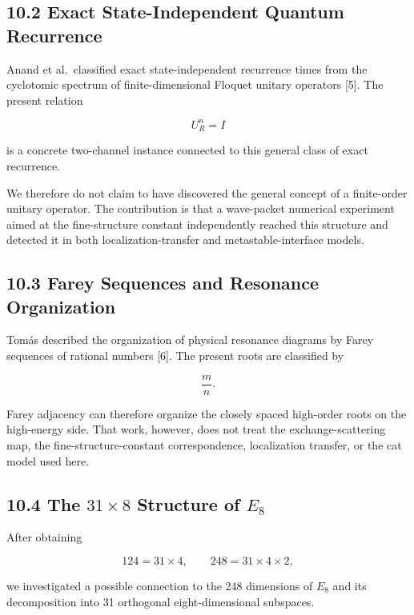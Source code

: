 \documentclass[
  10pt,
  a4paper,
]{article}
\begin{document}
\subsection{10.2 Exact State-Independent Quantum
Recurrence}\label{exact-state-independent-quantum-recurrence}

Anand et al.~classified exact state-independent recurrence times from
the cyclotomic spectrum of finite-dimensional Floquet unitary operators
{[}5{]}. The present relation

\[
U_R^n=I
\]

is a concrete two-channel instance connected to this general class of
exact recurrence.

We therefore do not claim to have discovered the general concept of a
finite-order unitary operator. The contribution is that a wave-packet
numerical experiment aimed at the fine-structure constant independently
reached this structure and detected it in both localization-transfer and
metastable-interface models.

\subsection{10.3 Farey Sequences and Resonance
Organization}\label{farey-sequences-and-resonance-organization}

Tomás described the organization of physical resonance diagrams by Farey
sequences of rational numbers {[}6{]}. The present roots are classified
by

\[
\frac{m}{n}.
\]

Farey adjacency can therefore organize the closely spaced high-order
roots on the high-energy side. That work, however, does not treat the
exchange-scattering map, the fine-structure-constant correspondence,
localization transfer, or the cat model used here.

\subsection{\texorpdfstring{10.4 The \(31\times8\) Structure of
\(E_8\)}{10.4 The 31\textbackslash times8 Structure of E\_8}}\label{the-31times8-structure-of-e_8}

After obtaining

\[
124=31\times4,
\qquad
248=31\times4\times2,
\]

we investigated a possible connection to the 248 dimensions of \(E_8\)
and its decomposition into 31 orthogonal eight-dimensional subspaces.
\end{document}
